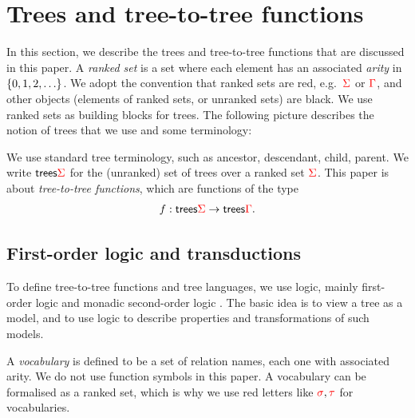 \section{Trees and tree-to-tree functions}
\label{sec:trees-transductions}
 In this section, we describe the trees and tree-to-tree functions that are discussed in this paper. 
A \emph{ranked set} is a set where each element has an associated \emph{arity} in $\{0,1,2,\ldots\}$. We adopt the convention that ranked sets are red, e.g.~${\color{red}{\Sigma}}$ or ${\color{red}{\Gamma}}$, and other objects (elements of ranked sets, or unranked sets) are black.  We use ranked sets as building blocks for trees. The following picture describes the notion of trees that we use and some terminology:


We use standard tree terminology, such as ancestor, descendant, child, parent. We write $\mathsf {trees} {\color{red}{\Sigma}}$ for the (unranked) set of trees over a ranked set ${\color{red}{\Sigma}}$. This paper is about \emph{tree-to-tree functions}, which are functions of the type \begin{align*}
f : \mathsf {trees} {\color{red}{\Sigma}} \to \mathsf {trees} {\color{red}{\Gamma}}.
\end{align*}

  
\subsection{First-order logic and transductions}
To define tree-to-tree functions and tree languages, we use  logic, mainly first-order logic and monadic second-order logic \mso. The basic idea is to view a tree as a model, and to use logic to describe properties and transformations of such models.

A \emph{vocabulary} is defined to be a set of relation names, each one with associated arity.  We do not use function symbols in this paper. A  vocabulary can be formalised as a ranked set, which is why we use red letters like ${\color{red}{\sigma}}, {\color{red}{\tau}}$ for  vocabularies. 

